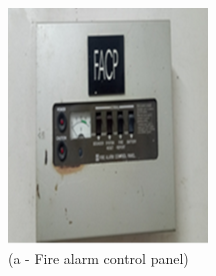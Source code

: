 \begin{figure}
	\begin{minipage}[b]{0.2\linewidth}
		\centering
				\includegraphics[width=\textwidth]{figures/fig_ch04_fdas_firealarmcontrolpannel}
		\caption*{(a - Fire alarm control panel)}
	\end{minipage}
	\hspace{0.05cm}
	\begin{minipage}[b]{0.2\linewidth}
		\centering

\end{minipage}
\end{figure}

